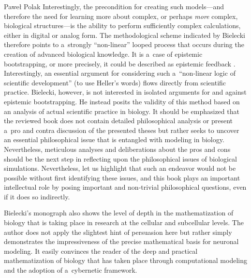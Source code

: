 \begin{newrevengenv}{Paweł Polak}
Interestingly, the precondition for creating such models—and therefore the need for learning more about complex, or perhaps \textit{more} complex, biological structures—is the ability to perform sufficiently complex calculations, either in digital or analog form. The methodological scheme indicated by Bielecki therefore points to a~strongly ``non-linear'' looped process that occurs during the creation of advanced biological knowledge. It is a~case of epistemic bootstrapping, or more precisely, it could be described as epistemic feedback
\parencite[][]{weisberg_bootstrapping_2010}. %
 Interestingly, an essential argument for considering such a~``non-linear logic of scientific development'' (to use Heller's words) flows directly from scientific practice. Bielecki, however, is not interested in isolated arguments for and against epistemic bootstrapping. He instead posits the validity of this method based on an analysis of actual scientific practice in biology. It should be emphasized that the reviewed book does not contain detailed philosophical analysis or present a~pro and contra discussion of the presented theses but rather seeks to uncover an essential philosophical issue that is entangled with modeling in biology. Nevertheless, meticulous analyses and deliberations about the pros and cons should be the next step in reflecting upon the philosophical issues of biological simulations. Nevertheless, let us highlight that such an endeavor would not be possible without first identifying these issues, and this book plays an important intellectual role by posing important and non-trivial philosophical questions, even if it does so indirectly.

Bielecki's monograph also shows the level of depth in the mathematization of biology that is taking place in research at the cellular and subcellular levels. The author does not apply the slightest hint of persuasion here but rather simply demonstrates the impressiveness of the precise mathematical basis for neuronal modeling. It easily convinces the reader of the deep and practical mathematization of biology that has taken place through computational modeling and the adoption of a~cybernetic framework.


\end{newrevengenv}
